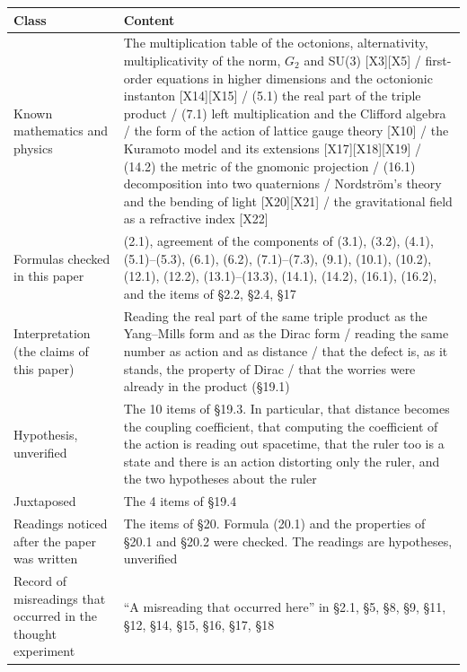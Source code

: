 \documentclass[
  a4paper,
]{article}
\newcounter{none} %
\begin{document}
{\def\LTcaptype{none} %
\begin{longtable}[]{@{}
  >{\raggedright\arraybackslash}p{}
  >{\raggedright\arraybackslash}p{}@{}}
\toprule\noalign{}
\begin{minipage}[b]{\linewidth}\raggedright
Class
\end{minipage} & \begin{minipage}[b]{\linewidth}\raggedright
Content
\end{minipage} \\
\midrule\noalign{}
\endhead
\bottomrule\noalign{}
\endlastfoot
Known mathematics and physics & The multiplication table of the
octonions, alternativity, multiplicativity of the norm, \(G_2\) and
SU(3) {[}X3{]}{[}X5{]} / first-order equations in higher dimensions and
the octonionic instanton {[}X14{]}{[}X15{]} / (5.1) the real part of the
triple product / (7.1) left multiplication and the Clifford algebra /
the form of the action of lattice gauge theory {[}X10{]} / the Kuramoto
model and its extensions {[}X17{]}{[}X18{]}{[}X19{]} / (14.2) the metric
of the gnomonic projection / (16.1) decomposition into two quaternions /
Nordström's theory and the bending of light {[}X20{]}{[}X21{]} / the
gravitational field as a refractive index {[}X22{]} \\
Formulas checked in this paper & (2.1), agreement of the components of
(3.1), (3.2), (4.1), (5.1)--(5.3), (6.1), (6.2), (7.1)--(7.3), (9.1),
(10.1), (10.2), (12.1), (12.2), (13.1)--(13.3), (14.1), (14.2), (16.1),
(16.2), and the items of §2.2, §2.4, §17 \\
Interpretation (the claims of this paper) & Reading the real part of the
same triple product as the Yang--Mills form and as the Dirac form /
reading the same number as action and as distance / that the defect is,
as it stands, the property of Dirac / that the worries were already in
the product (§19.1) \\
Hypothesis, unverified & The 10 items of §19.3. In particular, that
distance becomes the coupling coefficient, that computing the
coefficient of the action is reading out spacetime, that the ruler too
is a state and there is an action distorting only the ruler, and the two
hypotheses about the ruler \\
Juxtaposed & The 4 items of §19.4 \\
Readings noticed after the paper was written & The items of §20. Formula
(20.1) and the properties of §20.1 and §20.2 were checked. The readings
are hypotheses, unverified \\
Record of misreadings that occurred in the thought experiment & ``A
misreading that occurred here'' in §2.1, §5, §8, §9, §11, §12, §14, §15,
§16, §17, §18 \\
\end{longtable}
}
\end{document}

